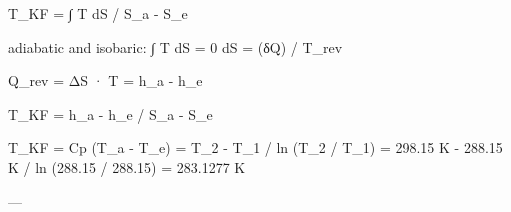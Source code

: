 T_KF = ∫ T dS / S_a - S_e  

adiabatic and isobaric:  
∫ T dS = 0  
dS = (δQ) / T_rev  

Q_rev = ΔS · T = h_a - h_e  

T_KF = h_a - h_e / S_a - S_e  

T_KF = Cp (T_a - T_e)  
= T_2 - T_1 / ln (T_2 / T_1)  
= 298.15 K - 288.15 K / ln (288.15 / 288.15)  
= 283.1277 K  

---